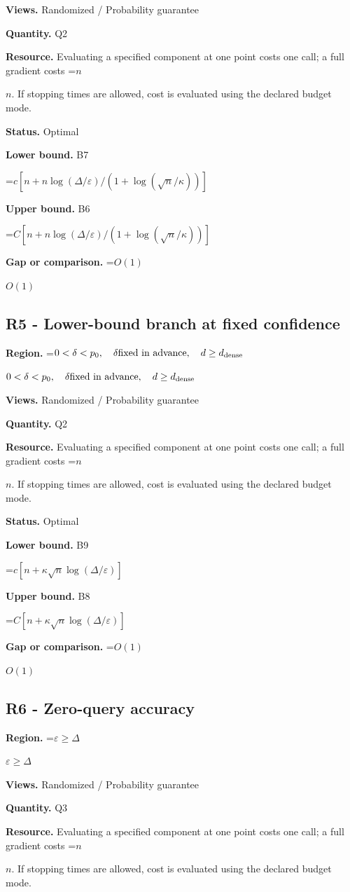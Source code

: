 \documentclass[10pt,a4paper]{article}
\newcommand{\AtlasMath}[1]{\par\begingroup\centering\setbox0=\hbox{$\displaystyle #1$}\ifdim\wd0>1.4\linewidth\typeout{ATLAS WIDE FORMULA: \the\wd0}\fi\ifdim\wd0>\linewidth\resizebox{\linewidth}{!}{\box0}\else\box0\fi\par\endgroup}
\newcommand{\AtlasInlineMath}[1]{\begingroup\setbox0=\hbox{$#1$}\ifdim\wd0>.4\linewidth\endgroup\AtlasMath{#1}\else\endgroup$#1$\fi}
\begin{document}
\textbf{Views.} Randomized / Probability guarantee

\textbf{Quantity.} Q2

\textbf{Resource.} Evaluating a specified component at one point costs one call; a full gradient costs \AtlasInlineMath{n}. If stopping times are allowed, cost is evaluated using the declared budget mode.

\textbf{Status.} Optimal

\textbf{Lower bound.} B7

\AtlasMath{c[n+n\log(\Delta/\varepsilon)/(1+\log(\sqrt n/\kappa))]}
\textbf{Upper bound.} B6

\AtlasMath{C[n+n\log(\Delta/\varepsilon)/(1+\log(\sqrt n/\kappa))]}
\textbf{Gap or comparison.} \AtlasInlineMath{O(1)}

\subsection{R5 - Lower-bound branch at fixed confidence}
\textbf{Region.} \AtlasInlineMath{0<\delta<p_0,\quad\delta\text{fixed in advance},\quad d\ge d_{\rm dense}}

\textbf{Views.} Randomized / Probability guarantee

\textbf{Quantity.} Q2

\textbf{Resource.} Evaluating a specified component at one point costs one call; a full gradient costs \AtlasInlineMath{n}. If stopping times are allowed, cost is evaluated using the declared budget mode.

\textbf{Status.} Optimal

\textbf{Lower bound.} B9

\AtlasMath{c[n+\kappa\sqrt n\log(\Delta/\varepsilon)]}
\textbf{Upper bound.} B8

\AtlasMath{C[n+\kappa\sqrt n\log(\Delta/\varepsilon)]}
\textbf{Gap or comparison.} \AtlasInlineMath{O(1)}

\subsection{R6 - Zero-query accuracy}
\textbf{Region.} \AtlasInlineMath{\varepsilon\ge\Delta}

\textbf{Views.} Randomized / Probability guarantee

\textbf{Quantity.} Q3

\textbf{Resource.} Evaluating a specified component at one point costs one call; a full gradient costs \AtlasInlineMath{n}. If stopping times are allowed, cost is evaluated using the declared budget mode.
\end{document}
